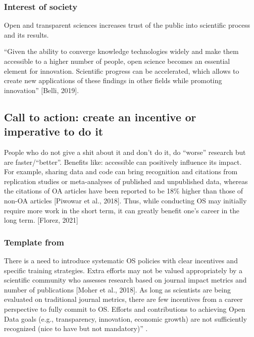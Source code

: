 \subsubsection{Interest of society}

%
Open and transparent sciences increases trust of the public into scientific
process and its results.

%
``Given the ability to converge knowledge technologies widely and make them
accessible to a higher number of people, open science becomes an essential
element for innovation.
%
Scientific progress can be accelerated, which allows to create new applications
of these findings in other fields while promoting innovation'' [Belli, 2019].


\subsection{Call to action: create an incentive or imperative to do it}

%
People who do not give a shit about it and don't do it, do ``worse'' research
but are faster/``better''.
%
Benefits like: accessible can positively influence its impact. For example,
sharing data and code can bring recognition and citations from replication
studies or meta-analyses of published and unpublished data, whereas the
citations of OA articles have been reported to be 18\% higher than those of
non-OA articles [Piwowar et al., 2018].
%
Thus, while conducting OS may initially require more work in the short term, it
can greatly benefit one’s career in the long term. [Florez, 2021]



\subsubsection{Template from \citet{toribio2021early}}

%
There is a need to introduce systematic OS policies with clear incentives and
specific training strategies.
%
Extra efforts may not be valued appropriately by a scientific community
who assesses research based on journal impact metrics and number of publications
[Moher et al., 2018].
%
As long as scientists are being evaluated on traditional journal metrics, there
are few incentives from a career perspective to fully commit to OS.
%
Efforts and contributions to achieving Open Data goals (e.g., transparency,
innovation, economic growth) are not sufficiently recognized (nice to have but
not mandatory)'' \citep{toribio2021early}.

